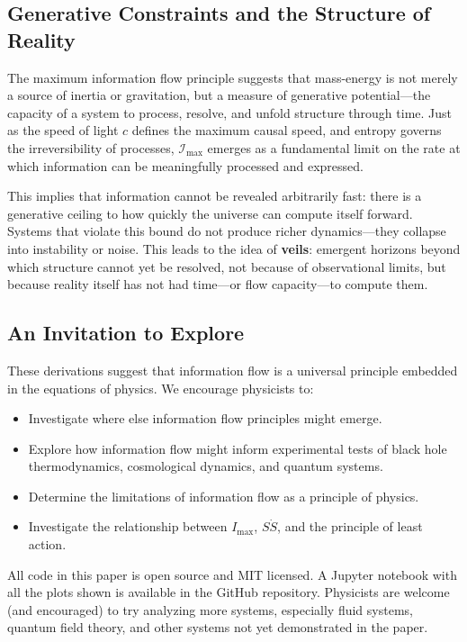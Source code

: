 \documentclass[12pt]{article}
\begin{document}
\subsection{Generative Constraints and the Structure of Reality}

The maximum information flow principle suggests that mass-energy is not merely a source of inertia or gravitation, but a measure of generative potential—the capacity of a system to process, resolve, and unfold structure through time. Just as the speed of light \( c \) defines the maximum causal speed, and entropy governs the irreversibility of processes, \( \mathcal{I}_{\text{max}} \) emerges as a fundamental limit on the rate at which information can be meaningfully processed and expressed.

This implies that information cannot be revealed arbitrarily fast: there is a generative ceiling to how quickly the universe can compute itself forward. Systems that violate this bound do not produce richer dynamics—they collapse into instability or noise. This leads to the idea of \textbf{veils}: emergent horizons beyond which structure cannot yet be resolved, not because of observational limits, but because reality itself has not had time—or flow capacity—to compute them.


\subsection{An Invitation to Explore}

These derivations suggest that information flow is a universal principle embedded in the equations of physics. We encourage physicists to:
\begin{itemize}
    \item Investigate where else information flow principles might emerge.
    \item Explore how information flow might inform experimental tests of black hole thermodynamics, cosmological dynamics, and quantum systems.
    \item Determine the limitations of information flow as a principle of physics.
    \item Investigate the relationship between $I_\text{max}$, $S \dot{S}$, and the principle of least action.
\end{itemize}

All code in this paper is open source and MIT licensed. A Jupyter notebook with all the plots shown is available in the GitHub repository. Physicists are welcome (and encouraged) to try analyzing more systems, especially fluid systems, quantum field theory, and other systems not yet demonstrated in the paper.
\end{document}

